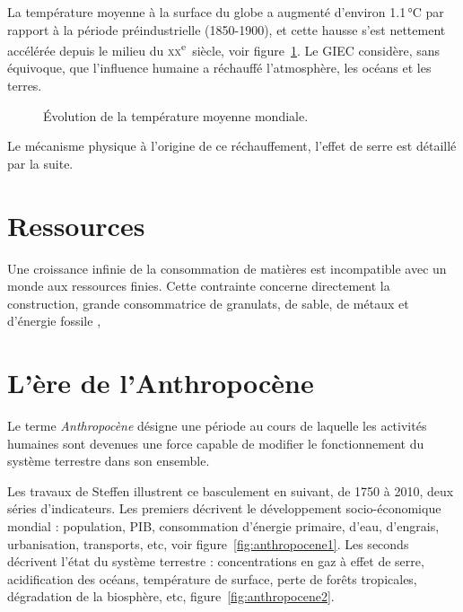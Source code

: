 La température moyenne à la surface du globe a augmenté d'environ 1.1\,°C par rapport à la période préindustrielle
(1850-1900), et cette hausse s'est nettement accélérée depuis le milieu
du \textsc{xx}\textsuperscript{e}~siècle, voir figure~\ref{fig:climat}. Le GIEC considère, sans équivoque, que l'influence humaine a réchauffé l'atmosphère, les océans et les terres.
 
\begin{figure}[htbp]
    \centering
    
    \caption{Évolution de la température moyenne mondiale\cite{ipcc_climate_2021}.}
    \label{fig:climat}
\end{figure}
 
Le mécanisme physique à l'origine de ce réchauffement, l'effet de serre est détaillé par la suite.
 
 
\section{Ressources}
\label{sec:ressources}
 
Une croissance infinie de la consommation de matières est incompatible avec un monde aux ressources finies. Cette contrainte concerne directement la construction, grande consommatrice de granulats, de sable, de métaux et d'énergie fossile , 
 
\section{L'ère de l'Anthropocène}
\label{sec:anthropocene}
 
Le terme \emph{Anthropocène} désigne une période au cours de laquelle les activités humaines sont devenues une force capable de modifier le fonctionnement du système terrestre dans son ensemble.
 
Les travaux de Steffen illustrent ce basculement en suivant, de 1750 à 2010, deux séries d'indicateurs. Les premiers décrivent le développement socio-économique
mondial : population, PIB, consommation d'énergie primaire, d'eau, d'engrais, urbanisation, transports, etc, voir figure~\ref{fig:anthropocene1}. Les seconds décrivent l'état du système terrestre : concentrations en gaz à effet de serre, acidification des océans, température de surface, perte de forêts tropicales, dégradation de la biosphère, etc, figure~\ref{fig:anthropocene2}.
 
